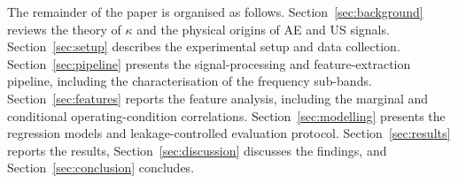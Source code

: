 The remainder of the paper is organised as follows.
Section~\ref{sec:background} reviews the theory of $\kappa$ and the physical origins of AE and US signals.
Section~\ref{sec:setup} describes the experimental setup and data collection.
Section~\ref{sec:pipeline} presents the signal-processing and feature-extraction pipeline, including the characterisation of the frequency sub-bands.
Section~\ref{sec:features} reports the feature analysis, including the marginal and conditional operating-condition correlations.
Section~\ref{sec:modelling} presents the regression models and leakage-controlled evaluation protocol.
Section~\ref{sec:results} reports the results,
Section~\ref{sec:discussion} discusses the findings, and
Section~\ref{sec:conclusion} concludes.

\clearpage